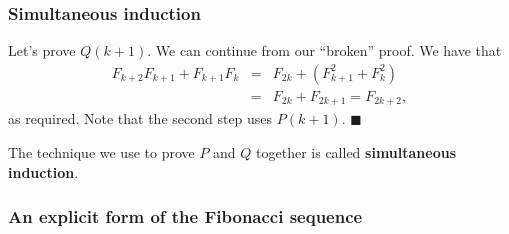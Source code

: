 \begin{frame}\frametitle{Simultaneous induction}
  Let's prove $Q(k+1)$. We can continue from our ``broken'' proof.  We
  have that
  \begin{eqnarray*}
    F_{k+2}F_{k+1}+F_{k+1}F_k
    &=& F_{2k} + (F_{k+1}^2 + F_k^2) \\
    &=& F_{2k} + F_{2k+1} = F_{2k+2},
  \end{eqnarray*}
  as required. Note that the second step uses $P(k+1)$. $\blacksquare$

  \vspace{0.2in}
  The technique we use to prove $P$ and $Q$ together is called {\bf
    simultaneous induction}.
\end{frame}

\begin{frame}\frametitle{An explicit form of the Fibonacci sequence}
\end{frame}
